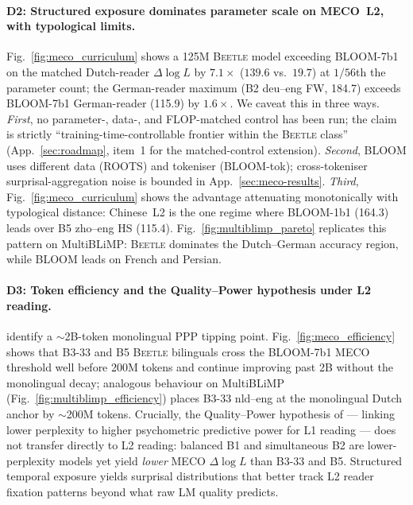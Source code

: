 \documentclass[11pt]{article}
\begin{document}
\paragraph{D2: Structured exposure dominates parameter scale on MECO~L2, with typological limits.} Fig.~\ref{fig:meco_curriculum} shows a 125M \textsc{Beetle} model exceeding BLOOM-7b1 on the matched Dutch-reader $\Delta\log L$ by $7.1\times$ ($139.6$ vs.\ $19.7$) at $1/56$th the parameter count; the German-reader maximum (B2 deu--eng FW, 184.7) exceeds BLOOM-7b1 German-reader (115.9) by $1.6\times$. We caveat this in three ways. \textit{First}, no parameter-, data-, and FLOP-matched control has been run; the claim is strictly ``training-time-controllable frontier within the \textsc{Beetle} class'' (App.~\ref{sec:roadmap}, item~1 for the matched-control extension). \textit{Second}, BLOOM uses different data (ROOTS) and tokeniser (BLOOM-tok); cross-tokeniser surprisal-aggregation noise is bounded in App.~\ref{sec:meco-results}. \textit{Third}, Fig.~\ref{fig:meco_curriculum} shows the advantage attenuating monotonically with typological distance: Chinese~L2 is the one regime where BLOOM-1b1 (164.3) leads over B5 zho--eng HS (115.4). Fig.~\ref{fig:multiblimp_pareto} replicates this pattern on MultiBLiMP: \textsc{Beetle} dominates the Dutch--German accuracy region, while BLOOM leads on French and Persian.

\paragraph{D3: Token efficiency and the Quality--Power hypothesis under L2 reading.} \citet{aoyama-wilcox-2025-language} identify a $\sim$2B-token monolingual PPP tipping point. Fig.~\ref{fig:meco_efficiency} shows that B3-33 and B5 \textsc{Beetle} bilinguals cross the BLOOM-7b1 MECO threshold well before 200M tokens and continue improving past 2B without the monolingual decay; analogous behaviour on MultiBLiMP (Fig.~\ref{fig:multiblimp_efficiency}) places B3-33 nld--eng at the monolingual Dutch anchor by $\sim$200M tokens. Crucially, the Quality--Power hypothesis of \citet{wilcox-etal-2023-language} --- linking lower perplexity to higher psychometric predictive power for L1 reading --- does not transfer directly to L2 reading: balanced B1 and simultaneous B2 are lower-perplexity models yet yield \emph{lower} MECO $\Delta\log L$ than B3-33 and B5. Structured temporal exposure yields surprisal distributions that better track L2 reader fixation patterns beyond what raw LM quality predicts.
\end{document}
